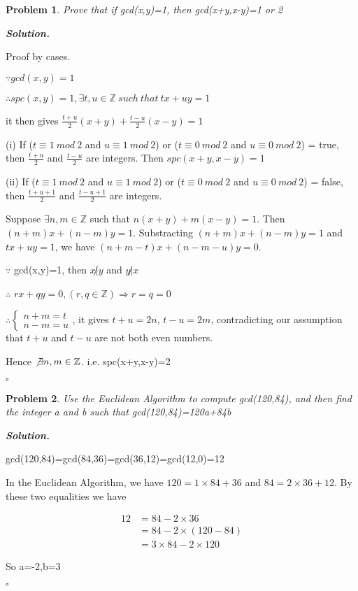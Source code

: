 \documentclass[12pt]{article}
\newtheorem{problem}{Problem}
\newenvironment{solution}[1][\it{Solution}]{\textbf{#1. } }{$\square$}
\begin{document}
\begin{problem}
  Prove that if gcd(x,y)=1, then gcd(x+y,x-y)=1 or 2
\end{problem}

\begin{solution}

Proof by cases.

$\because gcd(x,y)=1$

$\therefore spc(x,y)=1, \exists t,u\in\mathbb{Z}\ such\ that\ tx+uy=1$

it then gives $\frac{t+u}{2}(x+y)+\frac{t-u}{2}(x-y)=1$

(i) If ($t\equiv 1\ mod\ 2$ and $u\equiv 1\ mod\ 2$) or ($t\equiv 0\ mod\ 2$ and $u\equiv 0\ mod\ 2$) = true, then $\frac{t+u}{2}$ and $\frac{t-u}{2}$ are integers. Then $spc(x+y,x-y)=1$

(ii) If ($t\equiv 1\ mod\ 2$ and $u\equiv 1\ mod\ 2$) or ($t\equiv 0\ mod\ 2$ and $u\equiv 0\ mod\ 2$) = false, then $\frac{t+u+1}{2}$ and $\frac{t-u+1}{2}$ are integers.

Suppose $\exists n,m\in\mathbb{Z}$ such that $n(x+y)+m(x-y)=1$. Then $(n+m)x+(n-m)y=1$. Substracting $(n+m)x+(n-m)y=1$ and $tx+uy=1$, we have $(n+m-t)x+(n-m-u)y=0$.

$\because$ gcd(x,y)=1, then $x\not| y$ and $y\not| x$

$\therefore$ $rx+qy=0,(r,q\in\mathbb{Z})\Longrightarrow r=q=0$

$\therefore \begin{cases}
  n+m=t\\
  n-m=u
\end{cases}$, it gives $t+u=2n$, $t-u=2m$, contradicting our assumption that $t+u$ and $t-u$ are not both even numbers.

Hence $\not\exists n,m\in\mathbb{Z}$. i.e. spc(x+y,x-y)=2

\end{solution}

\begin{problem}
  Use the Euclidean Algorithm to compute gcd(120,84), and then find the integer a and b such that gcd(120,84)=120a+84b
\end{problem}

\begin{solution}

gcd(120,84)=gcd(84,36)=gcd(36,12)=gcd(12,0)=12

In the Euclidean Algorithm, we have $120=1\times84+36$ and $84=2\times36+12$. By these two equalities we have

$$\begin{aligned}
  12&=84-2\times36\\
  &=84-2\times(120-84)\\
  &=3\times84-2\times120
\end{aligned}$$

So a=-2,b=3

\end{solution}
\end{document}
